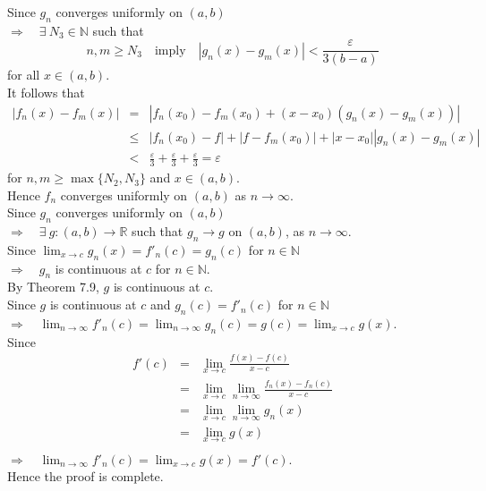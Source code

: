 \documentclass[12pt]{book}
\begin{document}
\begin{CJK}{UTF8}{bsmi}
Since $g_n$ converges uniformly on $(a, b)$ \\
$\Rightarrow\quad\exists\ N_3\in\mathbb{N}$ such that 
\[
n, m\ge N_3\quad\text{imply}\quad |g_n(x)-g_m(x)|<\frac{\varepsilon}{3(b-a)}
\]
for all $x\in(a, b)$. \\
It follows that
\begin{eqnarray*}
|f_n(x)-f_m(x)| 
    & = &   |f_n(x_0)-f_m(x_0)+(x-x_0)(g_n(x)-g_m(x))| \\
    &\le&   |f_n(x_0)-f|+|f-f_m(x_0)|+|x-x_0||g_n(x)-g_m(x)| \\
    & < &   \frac{\varepsilon}{3}+\frac{\varepsilon}{3}+\frac{\varepsilon}{3}=\varepsilon
\end{eqnarray*}
for $n, m\ge\max\{N_2, N_3\}$ and $x\in(a, b)$. \\
Hence $f_n$ converges uniformly on $(a, b)$ as $n\rightarrow\infty$. \\
Since $g_n$ converges uniformly on $(a, b)$ \\
$\Rightarrow\quad\exists\ g:(a, b)\rightarrow\mathbb{R}$ such that $g_n\rightarrow g$ on $(a, b)$, as $n\rightarrow\infty$. \\
Since $\lim_{x\rightarrow c}g_n(x)=f'_n(c)=g_n(c)$ for $n\in\mathbb{N}$ \\
$\Rightarrow\quad g_n$ is continuous at $c$ for $n\in\mathbb{N}$. \\
By Theorem 7.9, $g$ is continuous at $c$. \\
Since $g$ is continuous at $c$ and $g_n(c)=f'_n(c)$ for $n\in\mathbb{N}$ \\
$\Rightarrow\quad\lim_{n\rightarrow\infty}f'_n(c)
=\lim_{n\rightarrow\infty} g_n(c)
=g(c)
=\lim_{x\rightarrow c}g(x)$. \\
Since
\begin{eqnarray*}
f'(c)
    & = &   \lim_{x\rightarrow c}\frac{f(x)-f(c)}{x-c} \\
    & = &   \lim_{x\rightarrow c}\lim_{n\rightarrow\infty}\frac{f_n(x)-f_n(c)}{x-c} \\
    & = &   \lim_{x\rightarrow c}\lim_{n\rightarrow\infty}g_n(x) \\
    & = &   \lim_{x\rightarrow c}g(x) \\
\end{eqnarray*}
$\Rightarrow\quad\lim_{n\rightarrow\infty}f'_n(c)=\lim_{x\rightarrow c}g(x)=f'(c)$. \\
Hence the proof is complete. \\

\end{CJK}
\end{document}
